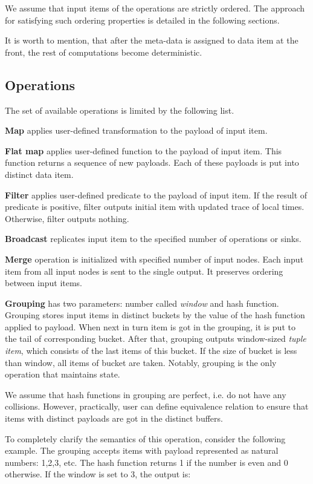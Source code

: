 We assume that input items of the operations are strictly ordered. The approach for satisfying such ordering properties is detailed in the following sections.

It is worth to mention, that after the meta-data is assigned to data item at the front, the rest of computations become deterministic.

\subsection{Operations}

The set of available operations is limited by the following list.

{\bf Map} applies user-defined transformation to the payload of input item. 

{\bf Flat map} applies user-defined function to the payload of input item. This function returns a sequence of new payloads. Each of these payloads is put into distinct data item. 

{\bf Filter} applies user-defined predicate to the payload of input item. If the result of predicate is positive, filter outputs initial item with updated trace of local times. Otherwise, filter outputs nothing.

{\bf Broadcast} replicates input item to the specified number of operations or sinks. 

{\bf Merge} operation is initialized with specified number of input nodes. Each input item from all input nodes is sent to the single output. It preserves ordering between input items.

{\bf Grouping} has two parameters: number called {\it window} and hash function. Grouping stores input items in distinct buckets by the value of the hash function applied to payload. When next in turn item is got in the grouping, it is put to the tail of corresponding bucket. After that, grouping outputs window-sized {\it tuple item}, which consists of the last items of this bucket. If the size of bucket is less than window, all items of bucket are taken. Notably, grouping is the only operation that maintains state.
	
We assume that hash functions in grouping are perfect, i.e. do not have any collisions. However, practically, user can define equivalence relation to ensure that items with distinct payloads are got in the distinct buffers.
	
To completely clarify the semantics of this operation, consider the following example. The grouping accepts items with payload represented as natural numbers: 1,2,3, etc. The hash function returns 1 if the number is even and 0 otherwise. If the window is set to 3, the output is:

